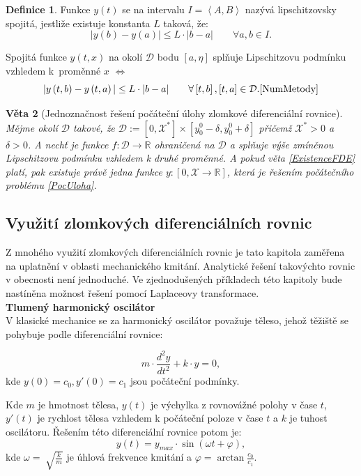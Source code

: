 \documentclass[a4paper,12pt,twoside]{article}
\newtheorem{veta}{Věta}[section]
\theoremstyle{definition}
\newtheorem{defin}[veta]{Definice}
\theoremstyle{remark}
\numberwithin{equation}{section}
\numberwithin{table}{section}
\numberwithin{figure}{section}
\newcommand{\R}{\mathbb{R}}
\begin{document}
\begin{defin}%
	Funkce $y\left(t\right)$ se na intervalu $I = \left\langle A, B \right\rangle $ nazývá lipschitzovsky spojitá, jestliže existuje konstanta $L$ taková, že:
	$$|y\left(b\right)- y\left(a\right)| \leq L \cdot |b-a| \qquad  \forall a,b \in I.$$
\end{defin}

Spojitá funkce  $y\left(t,x\right)$ na okolí $\mathcal{D}$ bodu $\left[a, \eta\right]$ splňuje Lipschitzovu podmínku vzhledem k~proměnné $x$ $\Leftrightarrow$ 
$$ |y\left(t, b\right)- y\left( t, a\right)| \leq L \cdot |b-a| \qquad  \forall \left[t,b\right], \left[t,a\right]  \in \mathcal{D}. \cite{NumMetody} $$

\begin{veta} [Jednoznačnost řešení počáteční úlohy zlomkové diferenciální rovnice]
	Mějme okolí $\mathcal{D}$ takové, že $\mathcal{D} := \left[0,\mathcal{X} ^{*}\right] \times \left[y_{0}^{0} - \delta , y_{0}^{0} + \delta \right] $ přičemž $\mathcal{X}^{*} > 0$ a $\delta > 0$. A nechť je funkce $f: \mathcal{D} \to \R$ ohraničená na $\mathcal{D}$ a splňuje výše zmíněnou Lipschitzovu podmínku vzhledem k druhé proměnné. A pokud věta \ref{ExistenceFDE} platí, pak existuje právě jedna funkce $y:\left[0, \mathcal{X} \to \R\right]$, která je řešením počátečního problému \eqref{PocUloha}.
\end{veta}
\subsection{Využití zlomkových diferenciálních rovnic}
Z mnohého využití  zlomkových diferenciálních rovnic je tato kapitola zaměřena na uplatnění v oblasti mechanického kmitání. Analytické řešení takovýchto rovnic v obecnosti není jednoduché. Ve zjednodušených příkladech této kapitoly bude nastíněna možnost řešení pomocí Laplaceovy transformace.\\
\medskip
\textbf{Tlumený harmonický oscilátor} \label{TlumenyHarmonickyOscilator}\\
V klasické mechanice se za harmonický oscilátor považuje těleso, jehož těžiště se pohybuje podle diferenciální rovnice:

\begin{equation} \label{HarmonicOscilator}
	m \cdot \frac{d^{2} y}{d t^{2}} + k \cdot y = 0,	
\end{equation}
kde $y\left(0\right) = c_{0}, y'\left(0\right) = c_{1}$ jsou počáteční podmínky. 

Kde $m$ je hmotnost tělesa, $y\left(t\right)$ je výchylka z rovnovážné polohy v čase $t$, $y'\left(t\right)$ je rychlost tělesa vzhledem k počáteční poloze v čase $t$ a $k$ je tuhost oscilátoru.
Řešením této diferenciální rovnice potom je:
\begin{equation}
	y\left(t\right)  = y_{max} \cdot \sin{\left(\omega t + \varphi\right)},
\end{equation}
kde $\omega = \sqrt[]{\frac{k}{m}}$ je úhlová frekvence kmitání a $\varphi = \arctan{\frac{c_{0}}{c_{1}}}$. \cite{HRW} \cite{Fyzika1Kulhanek}
\end{document}
